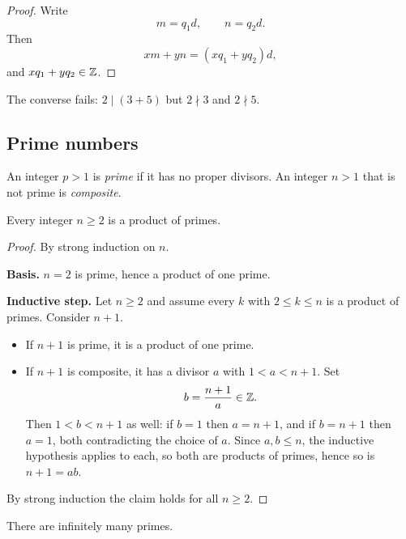 \documentclass[11pt]{article}
\begin{document}
\begin{proof}
Write
\[
m=q_1d, \qquad n=q_2d.
\]
Then
\[
xm+yn=(xq_1+yq_2)d,
\]
and $xq_1+yq_2\in\mathbb{Z}$.
\end{proof}

\begin{note}
The converse fails: $2\mid(3+5)$ but $2\nmid3$ and $2\nmid5$.
\end{note}

\subsection{Prime numbers}
\label{sec:primes}

\begin{definition}
An integer $p>1$ is \emph{prime} if it has no proper divisors. An integer $n>1$ that is not prime is \emph{composite}.
\end{definition}

\begin{theorem}
\label{thm:primefactexists}
Every integer $n\ge2$ is a product of primes.
\end{theorem}

\begin{proof}
By strong induction on $n$.

\medskip
\noindent\textbf{Basis.} $n=2$ is prime, hence a product of one prime.

\medskip
\noindent\textbf{Inductive step.} Let $n\ge2$ and assume every $k$ with $2\le k\le n$ is a product of primes. Consider $n+1$.

\begin{itemize}
\item If $n+1$ is prime, it is a product of one prime.
\item If $n+1$ is composite, it has a divisor $a$ with $1<a<n+1$. Set
\[
b=\frac{n+1}{a}\in\mathbb{Z}.
\]
Then $1<b<n+1$ as well: if $b=1$ then $a=n+1$, and if $b=n+1$ then $a=1$, both contradicting the choice of $a$. Since $a,b\le n$, the inductive hypothesis applies to each, so both are products of primes, hence so is $n+1=ab$.
\end{itemize}

\medskip
\noindent By strong induction the claim holds for all $n\ge2$.
\end{proof}

\begin{theorem}
\label{thm:infprimes}
There are infinitely many primes.
\end{theorem}
\end{document}
